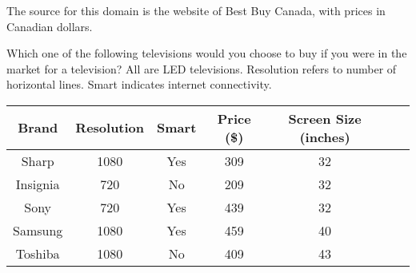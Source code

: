 
The source for this domain is the website of Best Buy Canada, with prices in Canadian dollars.

\begin{tcolorbox}
Which one of the following televisions would you choose to buy if you
were in the market for a television? All are LED televisions. Resolution
refers to number of horizontal lines. Smart indicates internet connectivity.

\begin{tabular}{ccccccc}
\hline
Brand & Resolution & Smart & Price (\$) & Screen Size (inches) &  \\ \hline
Sharp & 1080 & Yes & 309 & 32 &  \\ 
Insignia & 720 & No & 209 & 32 &  \\ 
Sony & 720 & Yes & 439 & 32 &  \\ 
Samsung & 1080 & Yes & 459 & 40 &  \\ 
Toshiba & 1080 & No & 409 & 43 &  \\
\hline
\end{tabular}
\end{tcolorbox}
